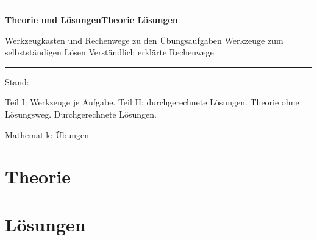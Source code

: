 \documentclass[11pt,a4paper]{article}
\begin{document}
\hypersetup{pageanchor=false}
\begin{titlepage}
  \centering
  \vspace*{3cm}
  {\color{phblau}\rule{\linewidth}{1.2pt}}\par\vspace{1.2em}
  {\Huge\bfseries\color{phblau}%
   \ifzeigetheorie\ifzeigeloesungen Theorie und Lösungen\else Theorie\fi
   \else Lösungen\fi\par}
  \vspace{0.6em}
  {\large\color{phgrau}%
   \ifzeigetheorie\ifzeigeloesungen
     Werkzeugkasten und Rechenwege zu den Übungsaufgaben
   \else Werkzeuge zum selbstständigen Lösen\fi
   \else Verständlich erklärte Rechenwege\fi\par}
  \vspace{1.2em}
  {\color{phblau}\rule{\linewidth}{1.2pt}}\par
  \vfill
  {\large \SkriptStand\par}
  \vspace{0.4em}
  {\small\color{phgrau} Stand: \StandDatum\par}
  \vspace{0.4em}
  {\small\color{phgrau}%
   \ifzeigetheorie\ifzeigeloesungen
     Teil I: Werkzeuge je Aufgabe. Teil II: durchgerechnete Lösungen.
   \else Theorie ohne Lösungsweg.\fi
   \else Durchgerechnete Lösungen.\fi\par}
  \vfill
  {\small\color{phgrau} Mathematik: Übungen\par}
\end{titlepage}
\hypersetup{pageanchor=true}

\tableofcontents
\clearpage

\ifzeigetheorie
  \part{Theorie}
  
\fi

\ifzeigeloesungen
  \clearpage
  \part{Lösungen}
  
\fi
\end{document}
